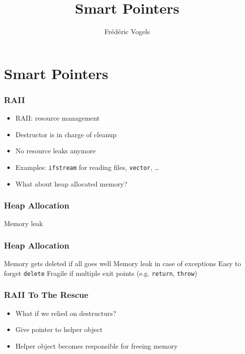 \usepackage{ucll-code}

\usetikzlibrary{shadows,shapes.multipart}

\title{Smart Pointers}
\author{Fr\'ed\'eric Vogels}


\lstset{language=c++14}



\begin{frame}
  \titlepage
\end{frame}

\section{Smart Pointers}
\frame{\tableofcontents[currentsection]}

\begin{frame}
  \frametitle{RAII}
  \begin{itemize}
    \item RAII: resource management
    \item Destructor is in charge of cleanup
    \item No resource leaks anymore
    \item Examples: {\tt ifstream} for reading files, {\tt vector}, \dots
    \item What about heap allocated memory?
  \end{itemize}
\end{frame}

\begin{frame}
  \frametitle{Heap Allocation}
  \begin{procontralist}
    \con Memory leak
  \end{procontralist}
\end{frame}

\begin{frame}
  \frametitle{Heap Allocation}
  \begin{procontralist}
    \pro Memory gets deleted if all goes well
    \con Memory leak in case of exceptions
    \con Easy to forget {\tt delete}
    \con Fragile if multiple exit points (e.g. {\tt return}, {\tt throw})
  \end{procontralist}
\end{frame}

\begin{frame}
  \frametitle{RAII To The Rescue}
  \begin{itemize}
    \item What if we relied on destructurs?
    \item Give pointer to helper object
    \item Helper object becomes responsible for freeing memory
  \end{itemize}
\end{frame}

